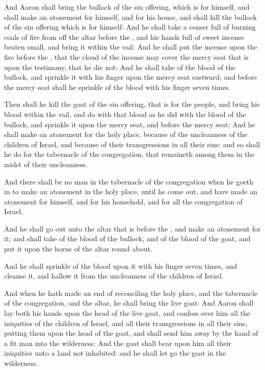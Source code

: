 \verse And Aaron shall bring the bullock of the sin offering, which is for himself, and shall make an atonement for himself, and for his house, and shall kill the bullock of the sin offering which is for himself: \verse And he shall take a censer full of burning coals of fire from off the altar before the \LORD, and his hands full of sweet incense beaten small, and bring it within the vail: \verse And he shall put the incense upon the fire before the \LORD, that the cloud of the incense may cover the mercy seat that is upon the testimony, that he die not: \verse And he shall take of the blood of the bullock, and sprinkle it with his finger upon the mercy seat eastward; and before the mercy seat shall he sprinkle of the blood with his finger seven times.

\verse Then shall he kill the goat of the sin offering, that is for the people, and bring his blood within the vail, and do with that blood as he did with the blood of the bullock, and sprinkle it upon the mercy seat, and before the mercy seat: \verse And he shall make an atonement for the holy place, because of the uncleanness of the children of Israel, and because of their transgressions in all their sins: and so shall he do for the tabernacle of the congregation, that remaineth among them in the midst of their uncleanness.

\verse And there shall be no man in the tabernacle of the congregation when he goeth in to make an atonement in the holy place, until he come out, and have made an atonement for himself, and for his household, and for all the congregation of Israel.

\verse And he shall go out unto the altar that is before the \LORD, and make an atonement for it; and shall take of the blood of the bullock, and of the blood of the goat, and put it upon the horns of the altar round about.

\verse And he shall sprinkle of the blood upon it with his finger seven times, and cleanse it, and hallow it from the uncleanness of the children of Israel.

\verse And when he hath made an end of reconciling the holy place, and the tabernacle of the congregation, and the altar, he shall bring the live goat: \verse And Aaron shall lay both his hands upon the head of the live goat, and confess over him all the iniquities of the children of Israel, and all their transgressions in all their sins, putting them upon the head of the goat, and shall send him away by the hand of a fit man into the wilderness: \verse And the goat shall bear upon him all their iniquities unto a land not inhabited: and he shall let go the goat in the wilderness.

